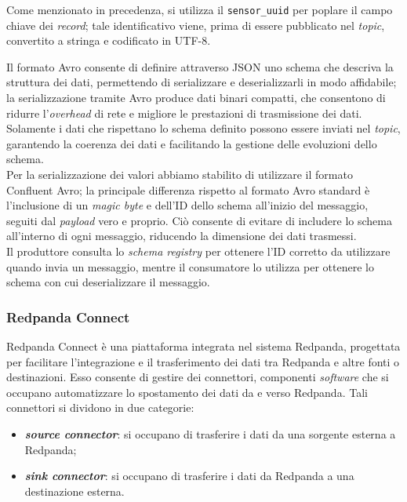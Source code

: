 Come menzionato in precedenza, si utilizza il \texttt{sensor\_uuid} per poplare il campo chiave dei \textit{record}; tale identificativo viene, prima di essere pubblicato
nel \textit{topic}, convertito a stringa e codificato in UTF-8.

Il formato Avro consente di definire attraverso JSON uno schema che descriva la struttura dei dati, permettendo di serializzare e deserializzarli in modo affidabile; la serializzazione tramite
Avro produce dati binari compatti, che consentono di ridurre l'\textit{overhead} di rete e migliore le prestazioni di trasmissione dei dati.
Solamente i dati che rispettano lo schema definito possono essere inviati nel \textit{topic}, garantendo la coerenza dei dati e facilitando la gestione delle evoluzioni dello schema.\\
Per la serializzazione dei valori abbiamo stabilito di utilizzare il formato Confluent Avro; la principale differenza rispetto al formato Avro standard è l'inclusione di un \textit{magic byte}
e dell'ID dello schema all'inizio del messaggio, seguiti dal \textit{payload} vero e proprio. Ciò consente di evitare di includere lo schema all'interno di ogni messaggio, riducendo la dimensione dei dati trasmessi.\\
Il produttore consulta lo \textit{schema registry} per ottenere l'ID corretto da utilizzare quando invia un messaggio, mentre il consumatore lo utilizza per ottenere lo schema con
cui deserializzare il messaggio.


\subsubsection{Redpanda Connect}
Redpanda Connect è una piattaforma integrata nel sistema Redpanda, progettata per facilitare l'integrazione e il trasferimento dei dati tra Redpanda e altre fonti o destinazioni.
Esso consente di gestire dei connettori, componenti \textit{software} che si occupano automatizzare lo spostamento dei dati da e verso Redpanda. Tali connettori si dividono in due categorie:
\begin{itemize}
	\item \textbf{\textit{source connector}}: si occupano di trasferire i dati da una sorgente esterna a Redpanda;
	\item \textbf{\textit{sink connector}}: si occupano di trasferire i dati da Redpanda a una destinazione esterna.
\end{itemize}

